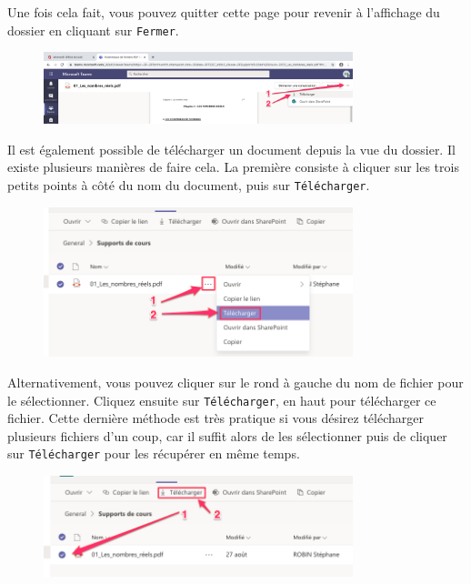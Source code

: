 Une fois cela fait, vous pouvez quitter cette page pour revenir à l'affichage du dossier en cliquant sur \texttt{Fermer}.
\newpage
\begin{figure}[H]
	\includegraphics[width=9cm]{./images/teams/telecharger_document_crop}
	\centering
\end{figure}

Il est également possible de télécharger un document depuis la vue du dossier. Il existe plusieurs manières de faire cela. La première consiste à cliquer sur les trois petits points à côté du nom du document, puis sur \texttt{Télécharger}.

\begin{figure}[H]
	\includegraphics[width=9cm]{./images/teams/telecharger1_crop}
	\centering
\end{figure}

Alternativement, vous pouvez cliquer sur le rond à gauche du nom de fichier pour le sélectionner. Cliquez ensuite sur \texttt{Télécharger}, en haut pour télécharger ce fichier. Cette dernière méthode est très pratique si vous désirez télécharger plusieurs fichiers d'un coup, car il suffit alors de les sélectionner puis de cliquer sur \texttt{Télécharger} pour les récupérer en même temps.

\begin{figure}[H]
	\includegraphics[width=9cm]{./images/teams/telecharger2_crop}
	\centering
\end{figure}



